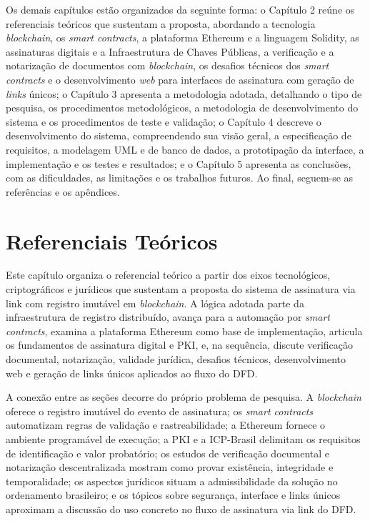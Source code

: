 \documentclass[
    12pt,
    a4paper,
    oneside,
    chapter=TITLE,
    section=TITLE,
    subsection=TITLE,
    subsubsection=TITLE,
    sumario=tradicional,
    english,
    brazil
]{abntex2}
\begin{document}
Os demais capítulos estão organizados da seguinte forma: o Capítulo 2
reúne os referenciais teóricos que sustentam a
proposta, abordando a tecnologia \emph{blockchain}, os \emph{smart
contracts}, a plataforma Ethereum e a linguagem Solidity, as
assinaturas digitais e a Infraestrutura de Chaves Públicas, a
verificação e a notarização de documentos com \emph{blockchain}, os
desafios técnicos dos \emph{smart contracts} e o desenvolvimento \emph{web}
para interfaces de assinatura com geração de \emph{links} únicos; o
Capítulo 3 apresenta a metodologia adotada, detalhando o tipo de
pesquisa, os procedimentos metodológicos, a metodologia de
desenvolvimento do sistema e os procedimentos de teste e validação; o
Capítulo 4 descreve o desenvolvimento do sistema, compreendendo sua visão geral, a especificação de
requisitos, a modelagem UML e de banco de dados, a prototipação da
interface, a implementação e os testes e resultados; e o Capítulo 5
apresenta as conclusões, com as dificuldades, as limitações e os
trabalhos futuros. Ao final, seguem-se as referências e os apêndices.

\chapter{Referenciais Teóricos}

Este capítulo organiza o referencial teórico a partir dos eixos
tecnológicos, criptográficos e jurídicos que sustentam a proposta do
sistema de assinatura via link com registro imutável em
\emph{blockchain}. A lógica adotada parte da infraestrutura de
registro distribuído, avança para a automação por \emph{smart
contracts}, examina a plataforma Ethereum como base de implementação,
articula os fundamentos de assinatura digital e PKI, e, na sequência,
discute verificação documental, notarização, validade jurídica,
desafios técnicos, desenvolvimento web e geração de links únicos
aplicados ao fluxo do DFD.

A conexão entre as seções decorre do próprio problema de pesquisa. A
\emph{blockchain} oferece o registro imutável do evento de
assinatura; os \emph{smart contracts} automatizam regras de validação
e rastreabilidade; a Ethereum fornece o ambiente programável de
execução; a PKI e a ICP-Brasil delimitam os requisitos de
identificação e valor probatório; os estudos de verificação
documental e notarização descentralizada mostram como provar
existência, integridade e temporalidade; os aspectos jurídicos situam
a admissibilidade da solução no ordenamento brasileiro; e os tópicos
sobre segurança, interface e links únicos aproximam a discussão do
uso concreto no fluxo de assinatura via link do DFD.
\end{document}
